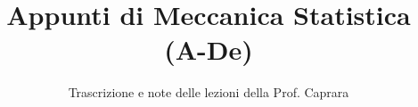 \documentclass[a4paper,12pt]{article}
\title{Appunti di Meccanica Statistica (A-De)}
\author{Trascrizione e note delle lezioni della Prof. Caprara}
\date{}
\begin{document}
\maketitle
\projectintro
\tableofcontents
\newpage

\end{document}
